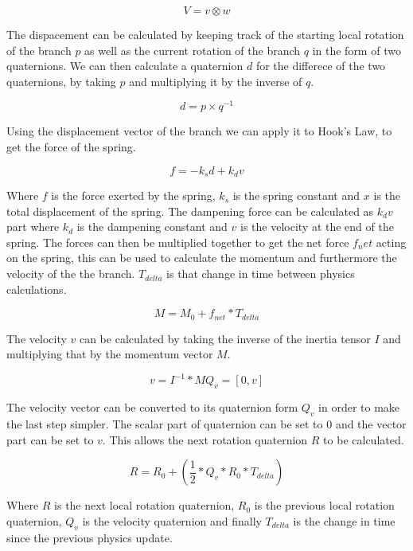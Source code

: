 \begin{equation}
V = v \otimes w
\end{equation}

\noindent
The dispacement can be calculated by keeping track of the starting local rotation of the branch $p$ as well as the current rotation of the branch $q$ in the form of two quaternions. We can then calculate a quaternion $d$ for the differece of the two quaternions, by taking $p$ and multiplying it by the inverse of $q$. 

\begin{equation}
d = p \times q^{-1}
\end{equation}

\noindent
Using the displacement vector of the branch we can apply it to Hook's Law, to get the force of the spring. 

\begin{equation}
f = -k _s d + k _d v
\end{equation}

\noindent
Where $f$ is the force exerted by the spring, $k _s$ is the spring constant and $x$ is the total displacement of the spring. The dampening force can be calculated as $k _d v$ part where $k _d$ is the dampening constant and $v$ is the velocity at the end of the spring. The forces can then be multiplied together to get the net force $f_net$ acting on the spring, this can be used to calculate the momentum and furthermore the velocity of the the branch. $T_{delta}$ is that change in time between physics calculations.

\begin{equation}
M = M_0 + f_{net} * T_{delta}
\end{equation}

\noindent
The velocity $v$ can be calculated by taking the inverse of the inertia tensor $I$ and multiplying that by the momentum vector $M$.

\begin{equation}
v = I^{-1} * M
Q_v = [0, v]
\end{equation}

\noindent
The velocity vector can be converted to its quaternion form $Q_v$ in order to make the last step simpler. The scalar part of quaternion can be set to 0 and the vector part can be set to $v$. This allows the next rotation quaternion $R$ to be calculated. 

\begin{equation}
R = R_0 + (\frac{1}{2} * Q_v * R_0 * T_{delta})
\end{equation}

\noindent
Where $R$ is the next local rotation quaternion, $R_0$ is the previous local rotation quaternion, $Q_v$ is the velocity quaternion and finally $T_{delta}$ is the change in time since the previous physics update.

